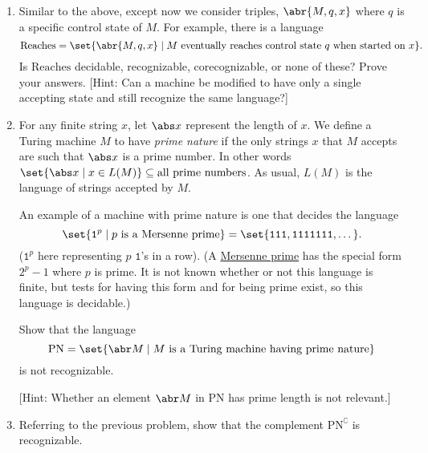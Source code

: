 \documentclass{cs81-homework}
\begin{document}
\begin{enumerate}
\item {} Similar to the above, except now we consider triples,
  \(\abr{M, q, x}\) where \(q\) is a specific control state of \(M\).  For
  example, there is a language
  \[
    \mathrm{Reaches} = \set{\abr{M, q, x} \mid \text{\(M\) eventually reaches
        control state \(q\) when started on \(x\)}}.
  \]
  Is \(\mathrm{Reaches}\) decidable, recognizable, corecognizable, or none of
  these?  Prove your answers.  [Hint: Can a machine be modified to have only a
  single accepting state and still recognize the same language?]

  \begin{solution}
  \end{solution}

\item {} For any finite string \(x\), let \(\abs x\) represent the
  length of \(x\).  We define a Turing machine \(M\) to have \emph{prime nature}
  if the only strings \(x\) that \(M\) accepts are such that \(\abs x\) is a
  prime number.  In other words
  \(\set{\abs x \mid x \in L(M)} \subseteq \text{all prime numbers}\).  As
  usual, \(L(M)\) is the language of strings accepted by \(M\).

  An example of a machine with prime nature is one that decides the language
  \[
    \set{\mathtt 1^p \mid \text{\(p\) is a Mersenne prime}} = \set{\mathtt{111},
      \mathtt{1111111}, \dots}.
  \]
  (\(\mathtt 1^p\) here representing \(p\) \(\mathtt 1\)'s in a row).  (A
  \href{https://en.wikipedia.org/wiki/Mersenne_prime}{Mersenne prime} has the
  special form \(2^p-1\) where \(p\) is prime.  It is not known whether or not
  this language is finite, but tests for having this form and for being prime
  exist, so this language is decidable.)

  Show that the language
  \[
    \mathrm{PN} = \set{\abr M \mid \text{\(M\) is a Turing machine having prime
        nature}}
  \]
  is not recognizable.
  
  [Hint: Whether an element \(\abr M\) in \(\mathrm{PN}\) has prime length is
  not relevant.]

  \begin{solution}
  \end{solution}

\item {} Referring to the previous problem, show that the complement
  \(\mathrm{PN}^\complement\) is recognizable.

  \begin{solution}
  \end{solution}


\end{enumerate}
\end{document}
